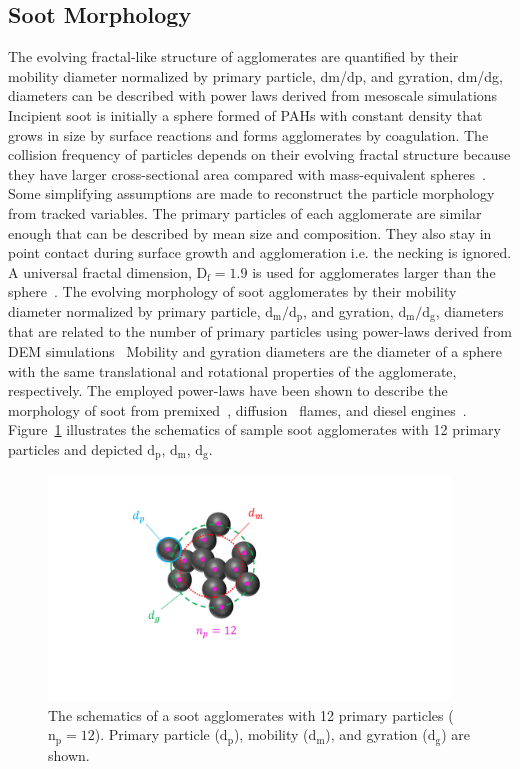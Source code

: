 \subsection{Soot Morphology}
\label{sec:sootmorphology}
The evolving fractal-like structure of agglomerates are quantified by their mobility diameter normalized by primary particle, dm/dp, and gyration, dm/dg, diameters can be described with power laws derived from mesoscale
simulations 
Incipient soot is initially a sphere formed of PAHs with constant density that grows in size by surface reactions and forms agglomerates by coagulation. The collision frequency of particles depends on their evolving fractal structure because they have larger cross-sectional area compared with mass-equivalent spheres~\citep{mulholland1988cluster}. Some simplifying assumptions are made to reconstruct the particle morphology from tracked variables. The primary particles of each agglomerate are similar enough that can be described by mean size and composition. They also stay in point contact during surface growth and agglomeration i.e. the necking is ignored. A universal fractal dimension,
$\mathrm{D_f=1.9}$ is used for agglomerates larger than the sphere~\citep{ball1984finite}.
The evolving morphology of soot agglomerates by their mobility diameter normalized by primary particle, $\mathrm{d_m/d_p}$, and gyration, $\mathrm{d_m/d_g}$, diameters that are related to the number of primary particles using power-laws derived from DEM simulations~\citep{Kelesidis2017} Mobility and gyration diameters are the diameter of a sphere with the same translational and rotational properties of the agglomerate, respectively. The employed power-laws have been shown to describe the morphology of soot from premixed~\citep{abid2008evolution}, diffusion~\citep{yon2015simple} flames, and diesel engines~\citep{rissler2013effective}. Figure~\ref{fig:Morphology} illustrates the schematics of sample soot agglomerates with 12 primary particles and depicted $\mathrm{d_p}$, $\mathrm{d_m}$, $\mathrm{d_g}$.  
\begin{figure}[!htbp]
	\centering
	\includegraphics[height=60mm, ]{Figures/Morphology.pdf}
	\caption{The schematics of a soot agglomerates with 12 primary particles ($\mathrm{n_p=12}$). Primary particle ($\mathrm{d_p}$), mobility ($\mathrm{d_m}$), and gyration ($\mathrm{d_g}$) are shown.}
	\label{fig:Morphology}
\end{figure} 

